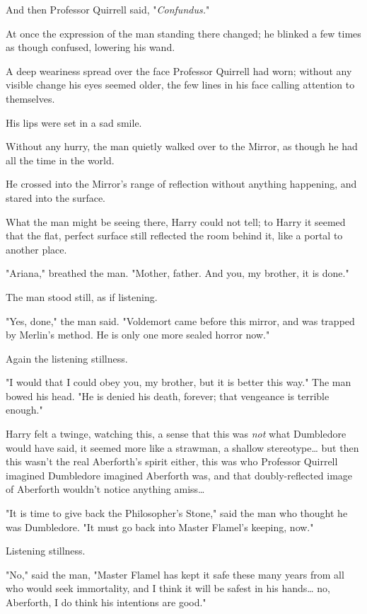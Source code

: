 And then Professor Quirrell said, "\emph{Confundus.}"

At once the expression of the man standing there changed; he blinked a few
times as though confused, lowering his wand.

A deep weariness spread over the face Professor Quirrell had worn; without any
visible change his eyes seemed older, the few lines in his face calling
attention to themselves.

His lips were set in a sad smile.

Without any hurry, the man quietly walked over to the Mirror, as though he had
all the time in the world.

He crossed into the Mirror's range of reflection without anything happening,
and stared into the surface.

What the man might be seeing there, Harry could not tell; to Harry it seemed
that the flat, perfect surface still reflected the room behind it, like a
portal to another place.

"Ariana," breathed the man. "Mother, father. And you, my brother, it is done."

The man stood still, as if listening.

"Yes, done," the man said. "Voldemort came before this mirror, and was trapped
by Merlin's method. He is only one more sealed horror now."

Again the listening stillness.

"I would that I could obey you, my brother, but it is better this way." The man
bowed his head. "He is denied his death, forever; that vengeance is terrible
enough."

Harry felt a twinge, watching this, a sense that this was \emph{not} what
Dumbledore would have said, it seemed more like a strawman, a shallow
stereotype{\ldots} but then this wasn't the real Aberforth's spirit either,
this was who Professor Quirrell imagined Dumbledore imagined Aberforth was, and
that doubly-reflected image of Aberforth wouldn't notice anything amiss{\ldots}

"It is time to give back the Philosopher's Stone," said the man who thought he
was Dumbledore. "It must go back into Master Flamel's keeping, now."

Listening stillness.

"No," said the man, "Master Flamel has kept it safe these many years from all
who would seek immortality, and I think it will be safest in his hands{\ldots}
no, Aberforth, I do think his intentions are good."

